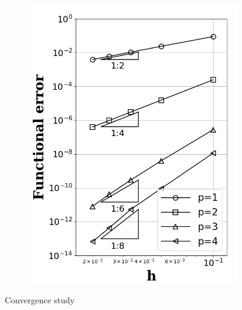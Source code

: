 \documentclass[a4paper]{article}
\begin{document}
\begin{figure}[!htbp]
\begin{subfigure}{0.325\textwidth}
    \includegraphics[width=1.0\linewidth]{figures/beta2.png}
    \label{fig:func_well}
  \end{subfigure}
  \caption{Convergence study}
   \label{fig:convergence} 
\end{figure}
\end{document}

